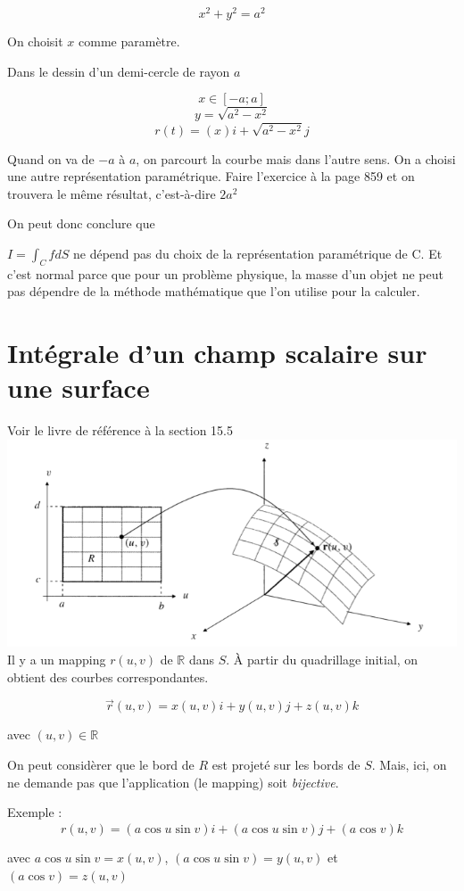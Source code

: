\[x^2+y^2 = a^2\]

On choisit $x$ comme paramètre.

Dans le dessin d'un demi-cercle de rayon $a$

\[x \in [-a;a]\]
\[y=\sqrt{a^2-x^2}\]
\[r(t) = (x)i + \sqrt{a^2-x^2} j\]

Quand on va de $-a$ à $a$, on parcourt la courbe mais dans l'autre sens. On a choisi une autre représentation paramétrique. Faire l'exercice à la page 859 et on trouvera le même résultat, c'est-à-dire $2a^2$

On peut donc conclure que

$I=\int_C f dS$ ne dépend pas du choix de la représentation paramétrique de C. Et c'est normal parce que pour un problème physique, la masse d'un objet ne peut pas dépendre de la méthode mathématique que l'on utilise pour la calculer.

\section{Intégrale d'un champ scalaire sur une surface}
Voir le livre de référence à la section 15.5\\
\includegraphics[scale=0.5]{courbe1.png}%
\\
Il y a un mapping $r(u,v)$ de $\mathbb{R}$ dans $S$. À partir du quadrillage initial, on obtient des courbes correspondantes.


\[\vec r(u,v)=x(u,v)i+y(u,v)j+z(u,v)k\]

avec $(u,v)\in \mathbb{R}$

On peut considèrer que le bord de $R$ est projeté sur les bords de $S$. Mais, ici, on ne demande pas que l'application (le mapping) soit \emph{bijective}.

Exemple : \[r(u,v) = (a \cos u \sin v) \hat i + (a \cos u \sin v) j +(a \cos v) k\]

avec $a \cos u \sin v = x(u,v)$, $(a \cos u \sin v)=y(u,v)$ et $(a \cos v) =z(u,v)$

